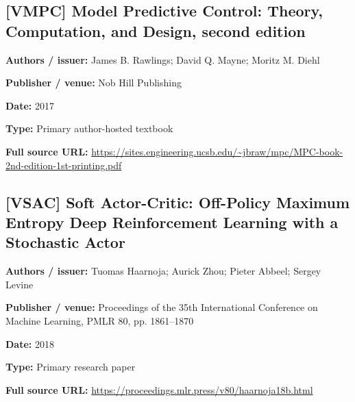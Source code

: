 \documentclass[10pt,letterpaper]{article}
\begin{document}
\subsection*{[VMPC] Model Predictive Control: Theory, Computation, and Design, second edition}
\textbf{Authors / issuer:} James B. Rawlings; David Q. Mayne; Moritz M. Diehl\par
\textbf{Publisher / venue:} Nob Hill Publishing\par
\textbf{Date:} 2017\par
\textbf{Type:} Primary author-hosted textbook\par
\textbf{Full source URL:} \href{https://sites.engineering.ucsb.edu/~jbraw/mpc/MPC-book-2nd-edition-1st-printing.pdf}{\small\ttfamily https:/\allowbreak{}/\allowbreak{}sites.\allowbreak{}engineering.\allowbreak{}ucsb.\allowbreak{}edu/\allowbreak{}\textasciitilde{}jbraw/\allowbreak{}mpc/\allowbreak{}MPC-\allowbreak{}book-\allowbreak{}2nd-\allowbreak{}edition-\allowbreak{}1st-\allowbreak{}printing.\allowbreak{}pdf}\par
\par\medskip
\subsection*{[VSAC] Soft Actor-Critic: Off-Policy Maximum Entropy Deep Reinforcement Learning with a Stochastic Actor}
\textbf{Authors / issuer:} Tuomas Haarnoja; Aurick Zhou; Pieter Abbeel; Sergey Levine\par
\textbf{Publisher / venue:} Proceedings of the 35th International Conference on Machine Learning, PMLR 80, pp. 1861--1870\par
\textbf{Date:} 2018\par
\textbf{Type:} Primary research paper\par
\textbf{Full source URL:} \href{https://proceedings.mlr.press/v80/haarnoja18b.html}{\small\ttfamily https:/\allowbreak{}/\allowbreak{}proceedings.\allowbreak{}mlr.\allowbreak{}press/\allowbreak{}v80/\allowbreak{}haarnoja18b.\allowbreak{}html}\par
\par\medskip
\end{document}
